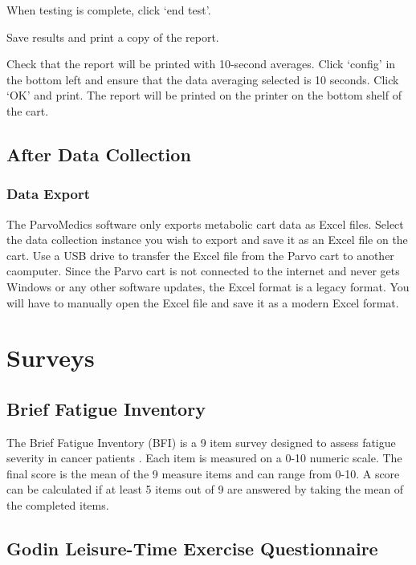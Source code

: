 \documentclass[
]{book}
\begin{document}
When testing is complete, click `end test'.

Save results and print a copy of the report.

Check that the report will be printed with 10-second averages. Click `config' in the bottom left and ensure that the data averaging selected is 10 seconds. Click `OK' and print. The report will be printed on the printer on the bottom shelf of the cart.

\hypertarget{Parvo-AfterDataCollection}{%
\section{After Data Collection}\label{Parvo-AfterDataCollection}}

\hypertarget{Parvo-DataExport}{%
\subsection{Data Export}\label{Parvo-DataExport}}

The ParvoMedics software only exports metabolic cart data as Excel files. Select the data collection instance you wish to export and save it as an Excel file on the cart. Use a USB drive to transfer the Excel file from the Parvo cart to another caomputer. Since the Parvo cart is not connected to the internet and never gets Windows or any other software updates, the Excel format is a legacy format. You will have to manually open the Excel file and save it as a modern Excel format.

\hypertarget{Appendix-Surveys}{%
\chapter{Surveys}\label{Appendix-Surveys}}

\hypertarget{Appendix-Surveys-bfi}{%
\section{Brief Fatigue Inventory}\label{Appendix-Surveys-bfi}}

The Brief Fatigue Inventory (BFI) is a 9 item survey designed to assess fatigue severity in cancer patients \citep{mendoza1999}. Each item is measured on a 0-10 numeric scale. The final score is the mean of the 9 measure items and can range from 0-10. A score can be calculated if at least 5 items out of 9 are answered by taking the mean of the completed items.

\hypertarget{Appendix-Surveys-glteq}{%
\section{Godin Leisure-Time Exercise Questionnaire}\label{Appendix-Surveys-glteq}}
\end{document}
